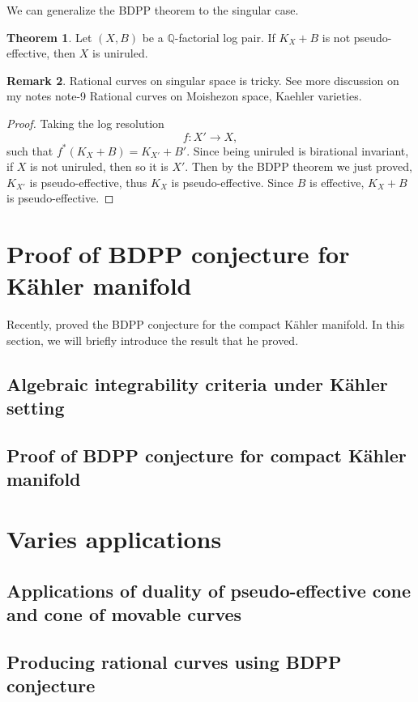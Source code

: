 \documentclass[11pt]{article}
\theoremstyle{definition}
\newtheorem{theorem}{Theorem}
\newtheorem{remark}[theorem]{Remark}
\begin{document}
	
	We can generalize the BDPP theorem to the singular case.
	\begin{theorem}
		Let $(X,B)$ be a $\mathbb{Q}$-factorial log pair. If $K_X+B$ is not pseudo-effective, then $X$ is uniruled.
	\end{theorem}
	\begin{remark}
		Rational curves on singular space is tricky. See more discussion on my notes note-9 Rational curves on Moishezon space, Kaehler varieties.
	\end{remark}
	\begin{proof}
		Taking the log resolution $$f:X'\to X, $$such that $f^*(K_X+B) =  K_{X'}+B'$. Since being uniruled is birational invariant, if $X$ is not uniruled, then so it is $X'$. Then by the BDPP theorem we just proved, $K_{X'}$ is pseudo-effective, thus $K_X$ is pseudo-effective. Since $B$ is effective, $K_X+B$ is pseudo-effective. 
	\end{proof}
	\section{Proof of BDPP conjecture for K\"ahler manifold}
	Recently, \cite{Ou} proved the BDPP conjecture for the compact K\"ahler manifold. In this section, we will briefly introduce the result that he proved.
	
	\subsection{Algebraic integrability criteria under K\"ahler setting}
	\subsection{Proof of BDPP conjecture for compact K\"ahler manifold}
	
	\section{Varies applications}
	\subsection{Applications of duality of pseudo-effective cone and cone of movable curves}
	
	\subsection{Producing rational curves using BDPP conjecture}
	
\end{document}
